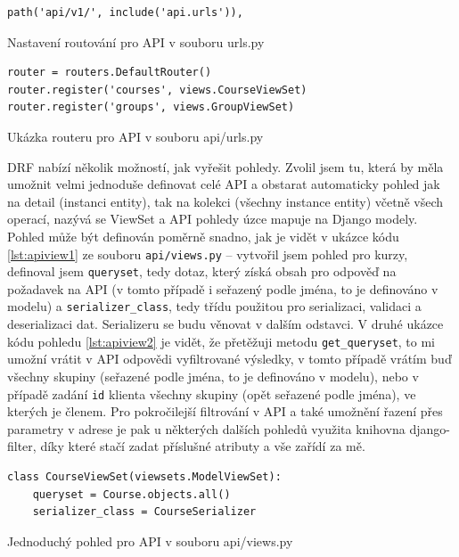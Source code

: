     \begin{listing}[ht]
    	\begin{verbatim}
path('api/v1/', include('api.urls')),
    	\end{verbatim}
    	\caption{Nastavení routování pro API v souboru urls.py}\label{lst:urls.py2}
    \end{listing}
    
    \begin{listing}[ht]
    	\begin{verbatim}
router = routers.DefaultRouter()
router.register('courses', views.CourseViewSet)
router.register('groups', views.GroupViewSet)
    	\end{verbatim}
    	\caption{Ukázka routeru pro API v souboru api/urls.py}\label{lst:apirouter}
    \end{listing}
    
    DRF nabízí několik možností, jak vyřešit pohledy. Zvolil jsem tu, která by měla umožnit velmi jednoduše definovat celé API a obstarat automaticky pohled jak na detail (instanci entity), tak na kolekci (všechny instance entity) včetně všech operací, nazývá se ViewSet a API pohledy úzce mapuje na Django modely. Pohled může být definován poměrně snadno, jak je vidět v ukázce kódu \ref{lst:apiview1} ze souboru \verb|api/views.py| -- vytvořil jsem pohled pro kurzy, definoval jsem \verb|queryset|, tedy dotaz, který získá obsah pro odpověď na požadavek na API (v tomto případě i seřazený podle jména, to je definováno v modelu) a \verb|serializer_class|, tedy třídu použitou pro serializaci, validaci a deserializaci dat. Serializeru se budu věnovat v dalším odstavci. V druhé ukázce kódu pohledu \ref{lst:apiview2} je vidět, že přetěžuji metodu \verb|get_queryset|, to mi umožní vrátit v API odpovědi vyfiltrované výsledky, v tomto případě vrátím buď všechny skupiny (seřazené podle jména, to je definováno v modelu), nebo v případě zadání \verb|id| klienta všechny skupiny (opět seřazené podle jména), ve kterých je členem. Pro pokročilejší filtrování v API a také umožnění řazení přes parametry v adrese je pak u některých dalších pohledů využita knihovna django-filter, díky které stačí zadat příslušné atributy a vše zařídí za mě.
    
    \begin{listing}[ht]
    	\begin{verbatim}
class CourseViewSet(viewsets.ModelViewSet):
    queryset = Course.objects.all()
    serializer_class = CourseSerializer
    	\end{verbatim}
    	\caption{Jednoduchý pohled pro API v souboru api/views.py}\label{lst:apiview1}
    \end{listing}
    
